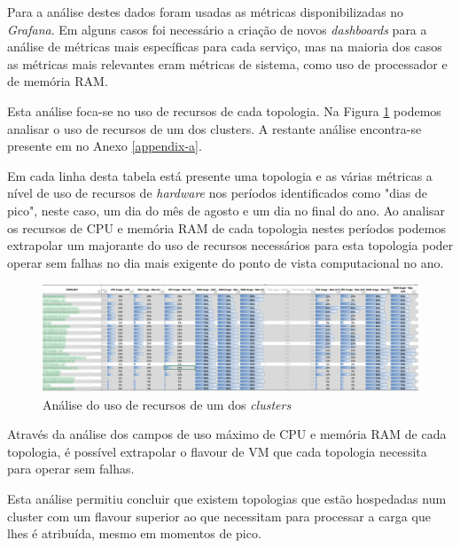 Para a análise destes dados foram usadas as métricas disponibilizadas no \textit{Grafana}. Em alguns
casos foi necessário a criação de novos \textit{dashboards} para a análise de métricas mais 
específicas para cada serviço, mas na maioria dos casos as métricas mais relevantes eram métricas 
de sistema, como uso de processador e de memória RAM.

Esta análise foca-se no uso de recursos de cada topologia. Na Figura \ref{analise-ofs} podemos
analisar o uso de recursos de um dos \glspl{cluster}. A restante análise encontra-se
presente em no Anexo \ref{appendix-a}.

Em cada linha desta tabela está presente uma topologia e as várias métricas a nível de uso de 
recursos de \textit{hardware} nos períodos identificados como "dias de pico", neste caso, um dia 
do mês de agosto e um dia no final do ano. Ao analisar os recursos de \ac{CPU} e memória RAM de 
cada topologia nestes períodos podemos extrapolar um majorante do uso de recursos necessários para
esta topologia poder operar sem falhas no dia mais exigente do ponto de vista computacional no ano.

\begin{figure}[H]
  \centerline{\includegraphics[scale=0.27]{media/content/analise/analise-ofs.png}}
  \caption{Análise do uso de recursos de um dos \textit{clusters}}
  \label{analise-ofs}
\end{figure}

Através da análise dos campos de uso máximo de \ac{CPU} e memória RAM de cada topologia, é possível
extrapolar o \gls{flavour} de \ac{VM} que cada topologia necessita para operar sem falhas.

Esta análise permitiu concluir que existem topologias que estão hospedadas num \gls{cluster}
com um \gls{flavour} superior ao que necessitam para processar a carga que lhes é atribuída,
mesmo em momentos de pico. 

